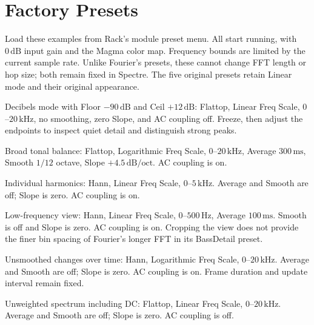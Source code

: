 \section{Factory Presets}\label{sec:presets}

Load these examples from Rack's module preset menu. All start running, with
$0\,\mathrm{dB}$ input gain and the Magma color map. Frequency bounds are
limited by the current sample rate. Unlike Fourier's presets, these cannot
change FFT length or hop size; both remain fixed in Spectre. The five
original presets retain Linear mode and their original appearance.

\begin{description}[style=nextline, leftmargin=0pt, labelwidth=0pt, labelsep=0pt]
  \item[DecibelInspection] Decibels mode with Floor $-90\,\mathrm{dB}$ and
  Ceil $+12\,\mathrm{dB}$: Flattop, Linear Freq Scale, $0$--$20\,\mathrm{kHz}$,
  no smoothing, zero Slope, and AC coupling off. Freeze, then adjust the
  endpoints to inspect quiet detail and distinguish strong peaks.
  \item[Mastering] Broad tonal balance: Flattop, Logarithmic Freq Scale,
  $0$--$20\,\mathrm{kHz}$, Average $300\,\mathrm{ms}$, Smooth $1/12$ octave,
  Slope $+4.5\,\mathrm{dB/oct}$. AC coupling is on.
  \item[Harmonics] Individual harmonics: Hann, Linear Freq Scale,
  $0$--$5\,\mathrm{kHz}$. Average and Smooth are off; Slope is zero.
  AC coupling is on.
  \item[BassDetail] Low-frequency view: Hann, Linear Freq Scale,
  $0$--$500\,\mathrm{Hz}$, Average $100\,\mathrm{ms}$. Smooth is off and
  Slope is zero. AC coupling is on. Cropping the view does not provide the
  finer bin spacing of Fourier's longer FFT in its BassDetail preset.
  \item[Transients] Unsmoothed changes over time: Hann, Logarithmic Freq Scale,
  $0$--$20\,\mathrm{kHz}$. Average and Smooth are off; Slope is zero.
  AC coupling is on. Frame duration and update interval remain fixed.
  \item[PluginDevelopment] Unweighted spectrum including DC: Flattop,
  Linear Freq Scale, $0$--$20\,\mathrm{kHz}$. Average and Smooth are off;
  Slope is zero. AC coupling is off.
\end{description}

